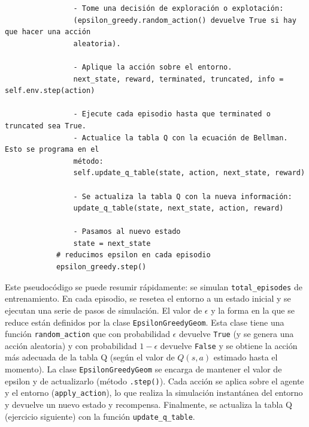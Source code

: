 \documentclass{article}
\begin{document}
\begin{exercise}[breakable]
\begin{small}
\begin{verbatim}
                - Tome una decisión de exploración o explotación: 
                (epsilon_greedy.random_action() devuelve True si hay que hacer una acción 
                aleatoria).
                
                - Aplique la acción sobre el entorno.
                next_state, reward, terminated, truncated, info = self.env.step(action)
            
                - Ejecute cada episodio hasta que terminated o truncated sea True.
                - Actualice la tabla Q con la ecuación de Bellman. Esto se programa en el
                método:
                self.update_q_table(state, action, next_state, reward)
               
                - Se actualiza la tabla Q con la nueva información:
                update_q_table(state, next_state, action, reward)
                
                - Pasamos al nuevo estado
                state = next_state
            # reducimos epsilon en cada episodio
            epsilon_greedy.step()
\end{verbatim}
\end{small}
\end{exercise}

Este pseudocódigo se puede resumir rápidamente: se simulan \texttt{total\_episodes} de entrenamiento. En cada episodio, se resetea el entorno a un estado inicial y se ejecutan una serie de pasos de simulación. El valor de $\epsilon$ y la forma en la que se reduce están definidos por la clase \texttt{EpsilonGreedyGeom}. Esta clase tiene una función \texttt{random\_action} que con probabilidad $\epsilon$ devuelve \texttt{True} (y se genera una acción aleatoria) y con probabilidad $1-\epsilon$ devuelve \texttt{False} y se obtiene la acción más adecuada de la tabla Q (según el valor de $Q(s,a)$ estimado hasta el momento). La clase \texttt{EpsilonGreedyGeom} se encarga de mantener el valor de epsilon y de actualizarlo (método \texttt{.step()}).  Cada acción se aplica sobre el agente y el entorno (\texttt{apply\_action}), lo que realiza la simulación instantánea del entorno y devuelve un nuevo estado y recompensa. Finalmente, se actualiza la tabla Q (ejercicio siguiente) con la función \texttt{update\_q\_table}. 

\end{document}
